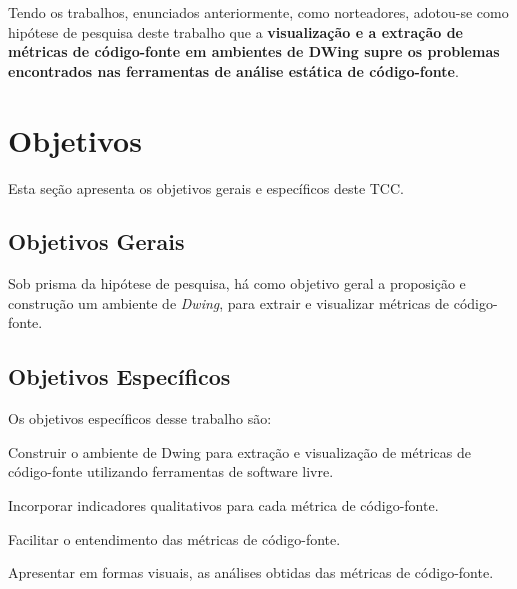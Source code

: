 Tendo os trabalhos, enunciados anteriormente, como norteadores, adotou-se como 
hipótese de pesquisa deste trabalho que a \textbf{visualização
e a extração de métricas de código-fonte em ambientes de DWing supre os problemas
encontrados nas ferramentas de análise estática de código-fonte}.








\section{Objetivos}

Esta seção apresenta os objetivos gerais e específicos deste TCC.

\subsection{Objetivos Gerais}
Sob prisma da hipótese de pesquisa, há como objetivo geral a proposição e 
construção um ambiente de \textit{Dwing}, para extrair e visualizar métricas de
código-fonte.



\subsection{Objetivos Específicos}

Os objetivos específicos desse trabalho são:


\begin{objectives}
	\item Construir o ambiente de Dwing para extração e visualização de métricas 
	de código-fonte utilizando ferramentas de software livre.
  
	\item Incorporar indicadores qualitativos para cada métrica de código-fonte.
	
	\item Facilitar o entendimento das métricas de código-fonte.
	
	\item Apresentar em formas visuais, as análises obtidas das métricas de 
	código-fonte.
	
    \end{objectives}
	


